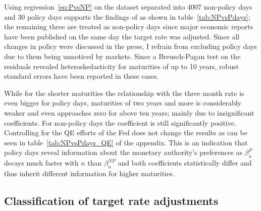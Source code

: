 Using regression~\eqref{eq:PvsNP} on the dataset separated into 4007 non-policy days and 30 policy days supports the findings of \textcite{Ellingsen.2003} as shown in table~\vref{tab:NPvsPdays}; the remaining three are treated as non-policy days since major economic reports have been published on the same day the target rate was adjusted. Since all changes in policy were discussed in the press, I refrain from excluding policy days due to them being unnoticed by markets. Since a Breusch-Pagan test on the residuals revealed heteroskedasticity for maturities of up to 10 years, robust standard errors have been reported in these cases.

%
While for the shorter maturities the relationship with the three month rate is even bigger for policy days, maturities of two years and more is considerably weaker and even approaches zero for above ten years; mainly due to insignificant coefficients. For non-policy days the coefficient is still significantly positive. Controlling for the QE efforts of the Fed does not change the results as can be seen in table~\vref{tab:NPvsPdays_QE} of the appendix. This is an indication that policy days reveal information about the monetary authority's preferences as $\beta_n^{P}$ decays much faster with $n$ than $\beta_n^{NP}$ and both coefficients statistically differ and thus inherit different information for higher maturities.

\subsection{Classification of target rate adjustments}

